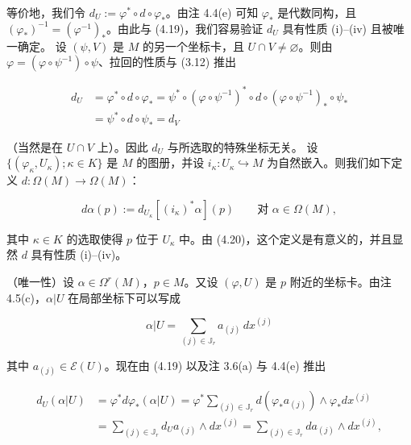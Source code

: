 \begin{theorem}
\begin{subitems}
等价地，我们令 $ d_{U} := \varphi^{\ast}\circ d\circ\varphi_{\ast} $。由注 4.4(e) 可知 $ \varphi_{\ast} $ 是代数同构，且 $ (\varphi_{\ast})^{-1} = (\varphi^{-1})_{\ast} $。由此与 (4.19)，我们容易验证 $ d_{U} $ 具有性质 (i)–(iv) 且被唯一确定。
设 $ (\psi, V) $ 是 $ M $ 的另一个坐标卡，且 $ U\cap V\neq\varnothing $。则由 $ \varphi = (\varphi\circ\psi^{-1})\circ\psi $、拉回的性质与 (3.12) 推出

\begin{equation}
\begin{aligned}
d_{U} &= \varphi^{\ast}\circ d\circ\varphi_{\ast} = \psi^{\ast}\circ(\varphi\circ\psi^{-1})^{\ast}\circ d\circ(\varphi\circ\psi^{-1})_{\ast}\circ\psi_{\ast} \\ &= \psi^{\ast}\circ d\circ\psi_{\ast} = d_{V}
\end{aligned}\tag{4.20}
\end{equation}

（当然是在 $ U\cap V $ 上）。因此 $ d_{U} $ 与所选取的特殊坐标无关。
设 $ \{(\varphi_{\kappa}, U_{\kappa}) ; \kappa\in K\} $ 是 $ M $ 的图册，并设 $ i_{\kappa}: U_{\kappa}\hookrightarrow M $ 为自然嵌入。则我们如下定义 $ d: \Omega(M)\to\Omega(M) $：

\[
d\alpha(p) := d_{U_{\kappa}}[(i_{\kappa})^{\ast}\alpha](p) \qquad \text{对 } \alpha\in\Omega(M) ,
\]

其中 $ \kappa\in K $ 的选取使得 $ p $ 位于 $ U_{\kappa} $ 中。由 (4.20)，这个定义是有意义的，并且显然 $ d $ 具有性质 (i)–(iv)。

\end{subitems}

\begin{items}
\item[（b）]

（唯一性）设 $ \alpha\in\Omega^{r}(M) $，$ p\in M $。又设 $ (\varphi, U) $ 是 $ p $ 附近的坐标卡。由注 4.5(c)，$ \alpha|U $ 在局部坐标下可以写成

\[
\alpha|U = \sum_{(j)\in\mathbb{J}_{r}} a_{(j)}\,dx^{(j)}
\]

其中 $ a_{(j)}\in\mathcal{E}(U) $。现在由 (4.19) 以及注 3.6(a) 与 4.4(e) 推出

\begin{equation}
\begin{aligned}
d_{U}(\alpha|U) &= \varphi^{\ast}d\varphi_{\ast}(\alpha|U) = \varphi^{\ast}\sum_{(j)\in\mathbb{J}_{r}} d(\varphi_{\ast}a_{(j)})\wedge\varphi_{\ast}dx^{(j)} \\ &= \sum_{(j)\in\mathbb{J}_{r}} d_{U}a_{(j)}\wedge dx^{(j)} = \sum_{(j)\in\mathbb{J}_{r}} da_{(j)}\wedge dx^{(j)} ,
\end{aligned}\tag{4.21}
\end{equation}


\end{items}
\end{theorem}
